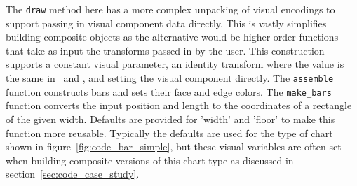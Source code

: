 \documentclass[../main.tex]{subfiles}
\begin{document}
The \texttt{draw} method here has a more complex unpacking of visual encodings to support passing in visual component data directly. This is vastly simplifies building composite objects as the alternative would be higher order functions that take as input the transforms passed in by the user. This construction supports a constant visual parameter, an identity transform where the value is the same in \dtotal\ and \vtotal, and setting the visual component directly. The \texttt{assemble} function constructs bars and sets their face and edge colors. The \texttt{make_bars} function converts the input position and length to the coordinates of a rectangle of the given width. Defaults are provided for 'width' and 'floor' to make this function more reusable. Typically the defaults are used for the type of chart shown in figure~\ref{fig:code_bar_simple}, but these visual variables are often set when building composite versions of this chart type as discussed in section~\ref{sec:code_case_study}. 
\end{document}

